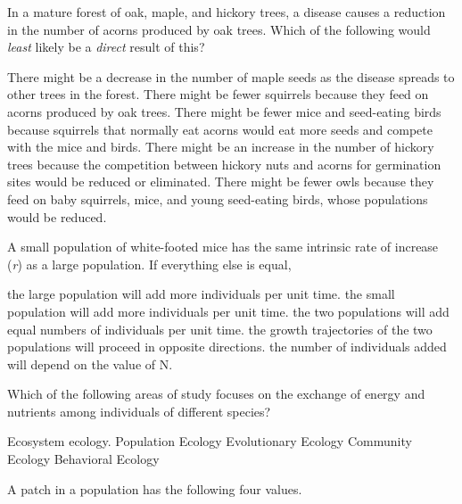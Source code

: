 \question
In a mature forest of oak, maple, and hickory trees, a disease causes a reduction in the number of acorns produced by oak trees. Which of the following would \emph{least} likely be a \emph{direct} result of this? 

\begin{choices}
\correctchoice There might be a decrease in the number of maple seeds as the disease spreads to other trees in the forest. %
\choice There might be fewer squirrels because they feed on acorns produced by oak trees. %
\choice  There might be fewer mice and seed-eating birds because squirrels that normally eat acorns would eat more seeds and compete with the mice and birds.%
\choice There might be an increase in the number of hickory trees because the competition between hickory nuts and acorns for germination sites would be reduced or eliminated. %
\choice There might be fewer owls because they feed on baby squirrels, mice, and young seed-eating birds, whose populations would be reduced. %
\end{choices}


\question
A small population of white-footed mice has the same intrinsic rate of increase (\textit{r}) as a large population.  If everything else is equal, 

\begin{choices}
\correctchoice the large population will add more individuals per unit time.  %
\choice the small population will add more individuals per unit time. %
\choice the two populations will add equal numbers of individuals per unit time.%
\choice the growth trajectories of the two populations will proceed in opposite directions. %
\choice the number of individuals added will depend on the value of N. %
\end{choices}


\question
Which of the following areas of study focuses on the exchange of energy and nutrients among individuals of different species?

\begin{choices}
\correctchoice Ecosystem ecology. %
\choice Population Ecology %
\choice Evolutionary Ecology %
\choice Community Ecology %
\choice Behavioral Ecology %
\end{choices}


\question
A patch in a population has the following four values. 

